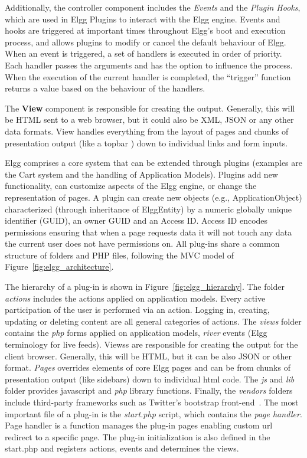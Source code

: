 Additionally, the controller component includes the \emph{Events} and the \emph{Plugin Hooks}, which are used in Elgg Plugins to interact with the Elgg engine. Events and hooks are triggered at important times throughout Elgg’s boot and execution process, and allows plugins to modify or cancel the default behaviour of Elgg. When an event is triggered, a set of handlers is executed in order of priority. Each handler passes the arguments and has the option to influence the process. When the execution of the current handler is completed, the ``trigger'' function returns a value based on the behaviour of the handlers.

The {\bf View} component is responsible for creating the output. Generally, this will be HTML sent to a web browser, but it could also be XML, JSON or any other data formats. View handles everything from the layout of pages and chunks of presentation output (like a topbar ) down to individual links and form inputs.

Elgg comprises a core system that can be extended through plugins (examples are the Cart system and the handling of Application Models). Plugins add new functionality, can customize aspects of the Elgg engine, or change the representation of pages.
A plugin can create new objects (e.g., ApplicationObject) characterized (through inheritance of ElggEntity) by a numeric globally unique identifier (GUID), an owner GUID and an Access ID. Access ID encodes permissions ensuring that when a page requests data it will not touch any data the current user does not have permissions on. All plug-ins share a common structure of folders and PHP files, following the MVC model of Figure~\ref{fig:elgg_architecture}.  

The hierarchy of a plug-in is shown in Figure~\ref{fig:elgg_hierarchy}. 
The folder {\em actions} includes the actions applied on application models. Every active participation of the user is performed via an action. Logging in, creating, updating or deleting content are all general categories of actions.
The {\em views} folder contains the {\em php} forms applied on application models, {\em river} events (Elgg terminology for live feeds). Viewss are responsible for creating the output for the client browser. Generally, this will be HTML, but it can be also JSON or other format. 
{\em Pages} overrides elements of core Elgg pages and can be from chunks of presentation output (like sidebars) down to individual html code.  
The {\em js} and {\em lib} folder provides javascript and {\em php} library functions. 
Finally, the {\em vendors} folders include third-party frameworks such as Twitter's bootstrap front-end~\cite{bootstrap_url}.
The most important file of a plug-in is the \emph{start.php} script, which contains the \emph{page handler}. Page handler is a function manages the plug-in pages enabling custom url redirect to a specific page. 
The plug-in initialization is also defined in the start.php and registers actions, events and determines the views. 

